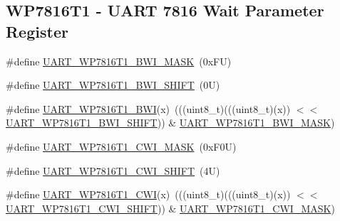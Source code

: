 \subsection*{W\+P7816\+T1 -\/ U\+A\+RT 7816 Wait Parameter Register}
\begin{DoxyCompactItemize}
\item 
\#define \mbox{\hyperlink{group___u_a_r_t___register___masks_ga9b252b9dd4381388279f30adc107d715}{U\+A\+R\+T\+\_\+\+W\+P7816\+T1\+\_\+\+B\+W\+I\+\_\+\+M\+A\+SK}}~(0x\+F\+U)
\item 
\#define \mbox{\hyperlink{group___u_a_r_t___register___masks_ga111a16bd25727769c150f337dfbb8da1}{U\+A\+R\+T\+\_\+\+W\+P7816\+T1\+\_\+\+B\+W\+I\+\_\+\+S\+H\+I\+FT}}~(0\+U)
\item 
\#define \mbox{\hyperlink{group___u_a_r_t___register___masks_gaf716107ac91a9a5bc9a1367bf6bfe9a6}{U\+A\+R\+T\+\_\+\+W\+P7816\+T1\+\_\+\+B\+WI}}(x)~(((uint8\+\_\+t)(((uint8\+\_\+t)(x)) $<$$<$ \mbox{\hyperlink{group___u_a_r_t___register___masks_ga111a16bd25727769c150f337dfbb8da1}{U\+A\+R\+T\+\_\+\+W\+P7816\+T1\+\_\+\+B\+W\+I\+\_\+\+S\+H\+I\+FT}})) \& \mbox{\hyperlink{group___u_a_r_t___register___masks_ga9b252b9dd4381388279f30adc107d715}{U\+A\+R\+T\+\_\+\+W\+P7816\+T1\+\_\+\+B\+W\+I\+\_\+\+M\+A\+SK}})
\item 
\#define \mbox{\hyperlink{group___u_a_r_t___register___masks_ga95c5796ae8b5d1bf0db4dcd07801eb16}{U\+A\+R\+T\+\_\+\+W\+P7816\+T1\+\_\+\+C\+W\+I\+\_\+\+M\+A\+SK}}~(0x\+F0\+U)
\item 
\#define \mbox{\hyperlink{group___u_a_r_t___register___masks_gaf78c95bd8fe42dfe6caeb8b9c8190e61}{U\+A\+R\+T\+\_\+\+W\+P7816\+T1\+\_\+\+C\+W\+I\+\_\+\+S\+H\+I\+FT}}~(4\+U)
\item 
\#define \mbox{\hyperlink{group___u_a_r_t___register___masks_ga4536e184765ba4b5fc283551be80dccc}{U\+A\+R\+T\+\_\+\+W\+P7816\+T1\+\_\+\+C\+WI}}(x)~(((uint8\+\_\+t)(((uint8\+\_\+t)(x)) $<$$<$ \mbox{\hyperlink{group___u_a_r_t___register___masks_gaf78c95bd8fe42dfe6caeb8b9c8190e61}{U\+A\+R\+T\+\_\+\+W\+P7816\+T1\+\_\+\+C\+W\+I\+\_\+\+S\+H\+I\+FT}})) \& \mbox{\hyperlink{group___u_a_r_t___register___masks_ga95c5796ae8b5d1bf0db4dcd07801eb16}{U\+A\+R\+T\+\_\+\+W\+P7816\+T1\+\_\+\+C\+W\+I\+\_\+\+M\+A\+SK}})
\end{DoxyCompactItemize}
